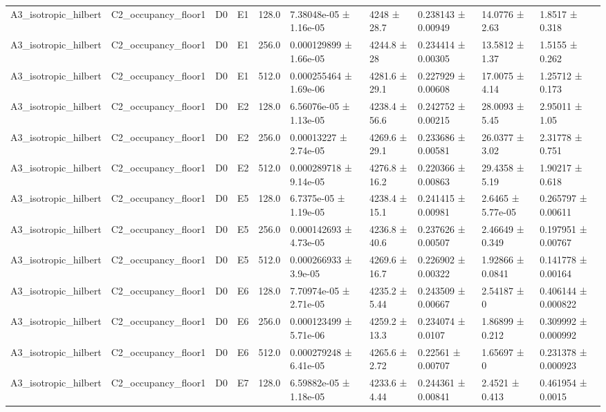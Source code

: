 \begin{table}
\begin{tabular}{llllllllll}
A3\_isotropic\_hilbert & C2\_occupancy\_floor1 & D0 & E1 & 128.0 & 7.38048e-05 ± 1.16e-05 & 4248 ± 28.7 & 0.238143 ± 0.00949 & 14.0776 ± 2.63 & 1.8517 ± 0.318 \\
A3\_isotropic\_hilbert & C2\_occupancy\_floor1 & D0 & E1 & 256.0 & 0.000129899 ± 1.66e-05 & 4244.8 ± 28 & 0.234414 ± 0.00305 & 13.5812 ± 1.37 & 1.5155 ± 0.262 \\
A3\_isotropic\_hilbert & C2\_occupancy\_floor1 & D0 & E1 & 512.0 & 0.000255464 ± 1.69e-06 & 4281.6 ± 29.1 & 0.227929 ± 0.00608 & 17.0075 ± 4.14 & 1.25712 ± 0.173 \\
A3\_isotropic\_hilbert & C2\_occupancy\_floor1 & D0 & E2 & 128.0 & 6.56076e-05 ± 1.13e-05 & 4238.4 ± 56.6 & 0.242752 ± 0.00215 & 28.0093 ± 5.45 & 2.95011 ± 1.05 \\
A3\_isotropic\_hilbert & C2\_occupancy\_floor1 & D0 & E2 & 256.0 & 0.00013227 ± 2.74e-05 & 4269.6 ± 29.1 & 0.233686 ± 0.00581 & 26.0377 ± 3.02 & 2.31778 ± 0.751 \\
A3\_isotropic\_hilbert & C2\_occupancy\_floor1 & D0 & E2 & 512.0 & 0.000289718 ± 9.14e-05 & 4276.8 ± 16.2 & 0.220366 ± 0.00863 & 29.4358 ± 5.19 & 1.90217 ± 0.618 \\
A3\_isotropic\_hilbert & C2\_occupancy\_floor1 & D0 & E5 & 128.0 & 6.7375e-05 ± 1.19e-05 & 4238.4 ± 15.1 & 0.241415 ± 0.00981 & 2.6465 ± 5.77e-05 & 0.265797 ± 0.00611 \\
A3\_isotropic\_hilbert & C2\_occupancy\_floor1 & D0 & E5 & 256.0 & 0.000142693 ± 4.73e-05 & 4236.8 ± 40.6 & 0.237626 ± 0.00507 & 2.46649 ± 0.349 & 0.197951 ± 0.00767 \\
A3\_isotropic\_hilbert & C2\_occupancy\_floor1 & D0 & E5 & 512.0 & 0.000266933 ± 3.9e-05 & 4269.6 ± 16.7 & 0.226902 ± 0.00322 & 1.92866 ± 0.0841 & 0.141778 ± 0.00164 \\
A3\_isotropic\_hilbert & C2\_occupancy\_floor1 & D0 & E6 & 128.0 & 7.70974e-05 ± 2.71e-05 & 4235.2 ± 5.44 & 0.243509 ± 0.00667 & 2.54187 ± 0 & 0.406144 ± 0.000822 \\
A3\_isotropic\_hilbert & C2\_occupancy\_floor1 & D0 & E6 & 256.0 & 0.000123499 ± 5.71e-06 & 4259.2 ± 13.3 & 0.234074 ± 0.0107 & 1.86899 ± 0.212 & 0.309992 ± 0.000992 \\
A3\_isotropic\_hilbert & C2\_occupancy\_floor1 & D0 & E6 & 512.0 & 0.000279248 ± 6.41e-05 & 4265.6 ± 2.72 & 0.22561 ± 0.00707 & 1.65697 ± 0 & 0.231378 ± 0.000923 \\
A3\_isotropic\_hilbert & C2\_occupancy\_floor1 & D0 & E7 & 128.0 & 6.59882e-05 ± 1.18e-05 & 4233.6 ± 4.44 & 0.244361 ± 0.00841 & 2.4521 ± 0.413 & 0.461954 ± 0.0015 \\

\end{tabular}
\end{table}
